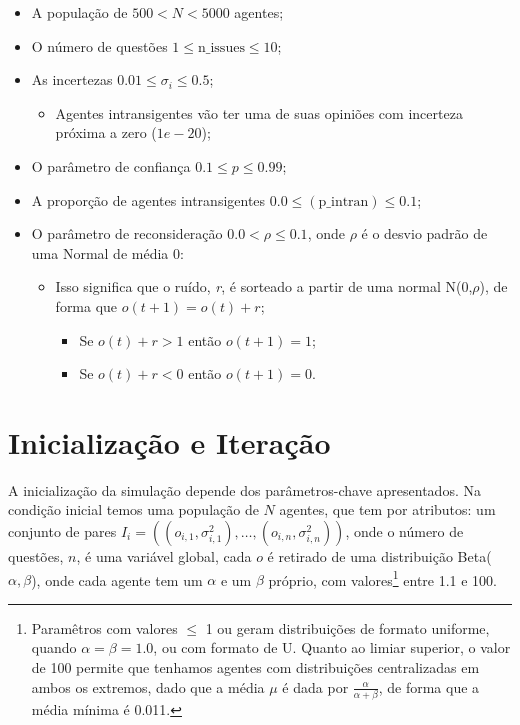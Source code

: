 \begin{itemize}
\item A população de \(500 < N < 5000\) agentes;
\item O número de questões \(1 \leq \text{n\_issues} \leq 10\); 

\item As incertezas \(0.01 \leq \sigma_i \leq 0.5\);
  \begin{itemize}
  \item Agentes intransigentes vão ter uma de suas opiniões com incerteza
    próxima a zero (\(1e-20\));
  \end{itemize}

\item O parâmetro de confiança \(0.1 \leq p \leq 0.99\);
  
\item A proporção de agentes intransigentes \(0.0 \leq (\text{p\_intran}) \leq 0.1\);

\item O parâmetro de reconsideração \(0.0 < \rho  \leq 0.1\), onde \(\rho\) é o desvio
  padrão de uma Normal de média 0:
  \begin{itemize}
  \item Isso significa que o ruído, \textit{r}, é sorteado a partir de uma
    normal N(0,\(\rho\)), de forma que \(o(t+1) = o(t) + r\);

    \begin{itemize}
    \item Se \(o(t) + r > 1\) então \(o(t+1) = 1\);
    \item Se \(o(t) + r < 0\) então \(o(t+1) = 0\).
    \end{itemize}
    
  \end{itemize}
 
\end{itemize}

\section{Inicialização e Iteração}

A inicialização da simulação depende dos parâmetros-chave apresentados. Na
condição inicial temos uma população de \(N\) agentes, que tem por atributos: um
conjunto de pares \(I_i = ((o_{i,1},\sigma_{i,1}^2), \ldots, (o_{i,n},\sigma_{i,n}^2))\), onde
o número de questões, \(n\), é uma variável global, cada \(o\) é retirado de uma
distribuição Beta(\(\alpha,\beta\)), onde cada agente tem um \(\alpha\) e um \(\beta\) próprio,
com valores\footnote{Paramêtros com valores \(\leq\) 1 ou geram distribuições de
  formato uniforme, quando \(\alpha = \beta = 1.0\), ou com formato de U. Quanto ao
  limiar superior, o valor de 100 permite que tenhamos agentes com distribuições
  centralizadas em ambos os extremos, dado que a média \(\mu\) é dada por
  \(\frac{\alpha}{\alpha + \beta}\), de forma que a média mínima é 0.011.} entre 1.1 e 100.

